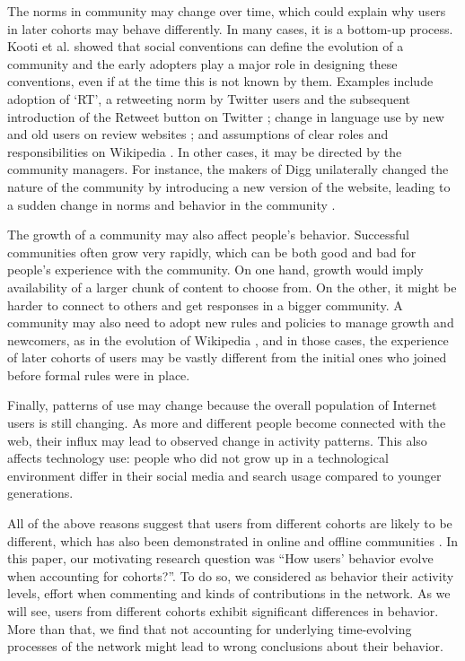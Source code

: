 The norms in community may change over time, which could explain why users in later cohorts may behave differently. In many cases, it is a bottom-up process. Kooti et al. \cite{Kooti2010} showed that social conventions can define the evolution of a community and the early adopters play a major role in designing these conventions, even if at the time this is not known by them. Examples include adoption of `RT', a retweeting norm by Twitter users and the subsequent introduction of the Retweet button on Twitter \cite{Kooti2010}; change in language use by new and old users on review websites \cite{Danescu-niculescu-mizil2013}; and assumptions of clear roles and responsibilities on Wikipedia \cite{Kittur2007a}. In other cases, it may be directed by the community managers. For instance, the makers of Digg unilaterally changed the nature of the community by introducing a new version of the website, leading to a sudden change in norms and behavior in the community \cite{Ingram2014,Lardinois2014}. 

The growth of a community may also affect people's behavior. Successful communities often grow very rapidly, which can be both good and bad for people's experience with the community. On one hand, growth would imply availability of a larger chunk of content to choose from. On the other, it might be harder to connect to others and get responses in a bigger community. A community may also need to adopt new rules and policies to manage growth and newcomers, as in the evolution of Wikipedia \cite{Choi2010,Bryant2005}, and in those cases, the experience of later cohorts of users may be vastly different from the initial ones who joined before formal rules were in place. 

Finally, patterns of use may change because the overall population of Internet users is still changing. As more and different people become connected with the web, their influx may lead to observed change in activity patterns.  This also affects technology use: people who did not grow up in a technological environment differ in their social media and search usage compared to younger generations\cite{Correa2010,Beldona2005}. 

All of the above reasons suggest that users from different cohorts are likely to be different, which has also been demonstrated in online and offline communities \cite{Ryder1965,Danescu-niculescu-mizil2013,Prensky2001,Correa2010}. In this paper, our motivating research question was ``How users' behavior evolve when accounting for cohorts?''. To do so, we considered as behavior their activity levels, effort when commenting and kinds of contributions in the network. As we will see, users from different cohorts exhibit significant differences in behavior. More than that, we find that not accounting for underlying time-evolving processes of the network might lead to wrong conclusions about their behavior.

